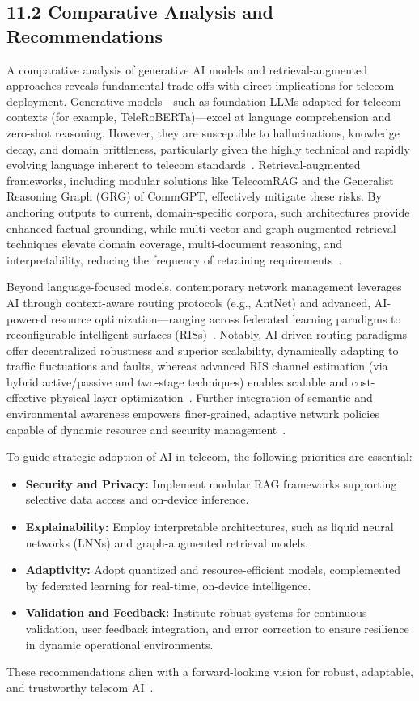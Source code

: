 \documentclass[11pt]{article}
\begin{document}
\subsection{11.2 Comparative Analysis and Recommendations}

A comparative analysis of generative AI models and retrieval-augmented approaches reveals fundamental trade-offs with direct implications for telecom deployment. Generative models—such as foundation LLMs adapted for telecom contexts (for example, TeleRoBERTa)—excel at language comprehension and zero-shot reasoning. However, they are susceptible to hallucinations, knowledge decay, and domain brittleness, particularly given the highly technical and rapidly evolving language inherent to telecom standards~\cite{ref7,ref16,ref20}. Retrieval-augmented frameworks, including modular solutions like TelecomRAG and the Generalist Reasoning Graph (GRG) of CommGPT, effectively mitigate these risks. By anchoring outputs to current, domain-specific corpora, such architectures provide enhanced factual grounding, while multi-vector and graph-augmented retrieval techniques elevate domain coverage, multi-document reasoning, and interpretability, reducing the frequency of retraining requirements~\cite{ref7,ref16}.

Beyond language-focused models, contemporary network management leverages AI through context-aware routing protocols (e.g., AntNet) and advanced, AI-powered resource optimization—ranging across federated learning paradigms to reconfigurable intelligent surfaces (RISs)~\cite{ref15,ref21,ref22,ref27}. Notably, AI-driven routing paradigms offer decentralized robustness and superior scalability, dynamically adapting to traffic fluctuations and faults, whereas advanced RIS channel estimation (via hybrid active/passive and two-stage techniques) enables scalable and cost-effective physical layer optimization~\cite{ref26,ref27}. Further integration of semantic and environmental awareness empowers finer-grained, adaptive network policies capable of dynamic resource and security management~\cite{ref15,ref20,ref21,ref28}.

To guide strategic adoption of AI in telecom, the following priorities are essential:
\begin{itemize}
    \item \textbf{Security and Privacy:} Implement modular RAG frameworks supporting selective data access and on-device inference.
    \item \textbf{Explainability:} Employ interpretable architectures, such as liquid neural networks (LNNs) and graph-augmented retrieval models.
    \item \textbf{Adaptivity:} Adopt quantized and resource-efficient models, complemented by federated learning for real-time, on-device intelligence.
    \item \textbf{Validation and Feedback:} Institute robust systems for continuous validation, user feedback integration, and error correction to ensure resilience in dynamic operational environments.
\end{itemize}
These recommendations align with a forward-looking vision for robust, adaptable, and trustworthy telecom AI~\cite{ref7,ref16,ref17,ref18,ref19,ref20,ref21,ref22,ref23,ref26,ref27,ref28,ref30}.
\end{document}
